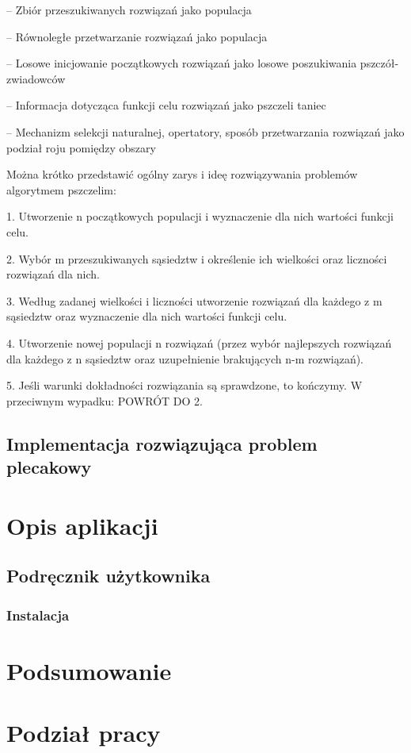 \documentclass[a4paper,12pt,notitlepage]{mwrep}
\begin{document}
-- Zbiór przeszukiwanych rozwiązań jako populacja

-- Równoległe przetwarzanie rozwiązań jako populacja

-- Losowe inicjowanie początkowych rozwiązań jako losowe poszukiwania pszczół-zwiadowców

-- Informacja dotycząca funkcji celu rozwiązań jako pszczeli taniec

-- Mechanizm selekcji naturalnej, opertatory, sposób przetwarzania rozwiązań jako podział roju pomiędzy obszary

Można krótko przedstawić ogólny zarys i ideę rozwiązywania problemów algorytmem pszczelim:

1. Utworzenie n początkowych populacji i wyznaczenie dla nich wartości funkcji celu.

2. Wybór m przeszukiwanych sąsiedztw i określenie ich wielkości oraz liczności rozwiązań dla nich.

3. Według zadanej wielkości i liczności utworzenie rozwiązań dla każdego z m sąsiedztw oraz wyznaczenie dla nich wartości funkcji celu.

4. Utworzenie nowej populacji n rozwiązań (przez wybór najlepszych rozwiązań dla każdego z n sąsiedztw oraz uzupełnienie brakujących n-m rozwiązań).

5. Jeśli warunki dokładności rozwiązania są sprawdzone, to kończymy. W przeciwnym wypadku: POWRÓT DO 2.


\section{Implementacja rozwiązująca problem plecakowy}

\chapter{Opis aplikacji}
\section{Podręcznik użytkownika}
\subsection{Instalacja}

\chapter{Podsumowanie}

\chapter{Podział pracy}
\end{document}
